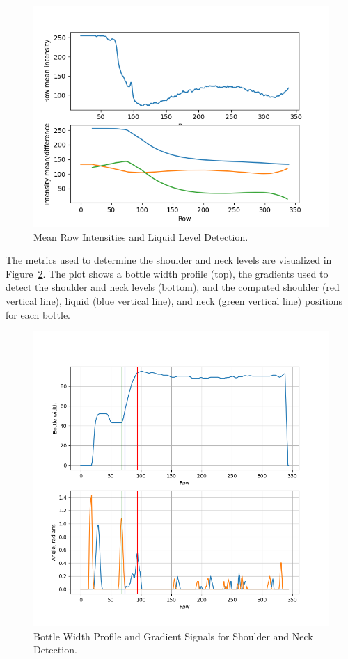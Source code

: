 \documentclass[a4paper,12pt]{article}
\begin{document}
\begin{figure}[!htbp]
    \centering
    \includegraphics[width=0.8\linewidth]{data/output/filled_bottles/bottle_3_mean_intensity.png}
    \caption{Mean Row Intensities and Liquid Level Detection.}
    \label{fig:liquid_levels}
\end{figure}

The metrics used to determine the shoulder and neck levels are visualized in Figure~\ref{fig:bottle_levels}. The plot shows a bottle width profile (top), the gradients used to detect the shoulder and neck levels (bottom), and the computed shoulder (red vertical line), liquid (blue vertical line), and neck (green vertical line) positions for each bottle.

\begin{figure}[!htbp]
    \centering
    \includegraphics[width=0.8\linewidth]{data/output/filled_bottles/bottle_3_bottle_levels.png}
    \caption{Bottle Width Profile and Gradient Signals for Shoulder and Neck Detection.}
    \label{fig:bottle_levels}
\end{figure}
\end{document}
